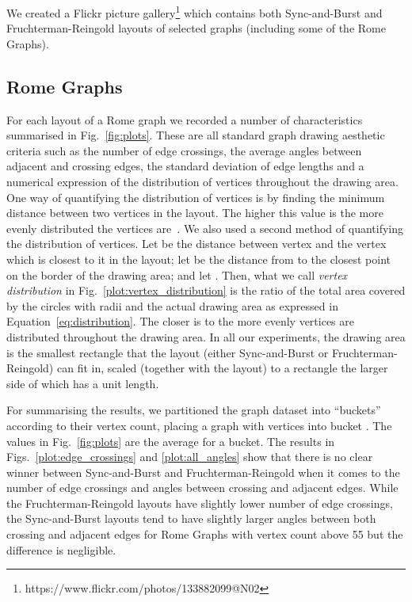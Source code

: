 \documentclass{llncs}
\begin{document}
We created a Flickr picture gallery\footnote{https://www.flickr.com/photos/133882099@N02} which contains both Sync-and-Burst and Fruchterman-Reingold layouts of selected graphs (including some of the Rome Graphs). 

\subsection{Rome Graphs}\label{sec:rome_graphs}

For each layout of a Rome graph we recorded a number of characteristics summarised in Fig.~\ref{fig:plots}. These are all standard graph drawing aesthetic criteria such as the number of edge crossings, the average angles between adjacent and crossing edges, the standard deviation of edge lengths and a numerical expression of the distribution of vertices throughout the drawing area. One way of quantifying the distribution of vertices is by finding the minimum distance between two vertices in the layout. The higher this value is the more evenly distributed the vertices are~\cite{LyoMeiRap1998}. We also used a second method of quantifying the distribution of vertices. Let  be the distance between vertex  and the vertex which is closest to it in the layout; let  be the distance from  to the closest point on the border of the drawing area; and let . Then, what we call \emph{vertex distribution}  in Fig.~\ref{plot:vertex_distribution} is the ratio of the total area covered by the circles with radii  and the actual drawing area  as expressed in Equation~\eqref{eq:distribution}. The closer  is to  the more evenly vertices are distributed throughout the drawing area. In all our experiments, the drawing area is the smallest rectangle that the layout (either Sync-and-Burst or Fruchterman-Reingold) can fit in, scaled (together with the layout) to a rectangle the larger side of which has a unit length.



For summarising the results, we partitioned the graph dataset into ``buckets'' according to their vertex count, placing a graph with  vertices into bucket . The values in Fig.~\ref{fig:plots} are the average for a bucket. The results in Figs.~\ref{plot:edge_crossings} and \ref{plot:all_angles} show that there is no clear winner between Sync-and-Burst and Fruchter\-man-Reingold when it comes to the number of edge crossings and angles between crossing and adjacent edges. While the Fruchterman-Reingold layouts have slightly lower number of edge crossings, the Sync-and-Burst layouts tend to have slightly larger angles between both crossing and adjacent edges for Rome Graphs with vertex count above 55 but the difference is negligible.
\end{document}
